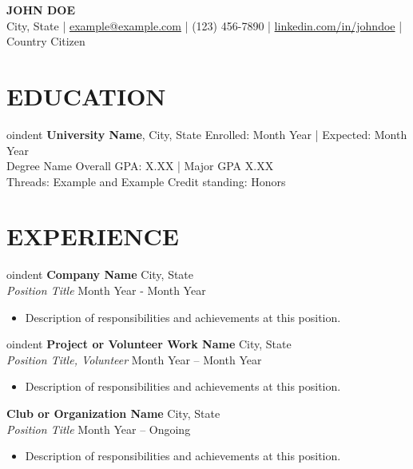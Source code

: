 \documentclass[a4paper,9pt]{extarticle}
\begin{document}
\pagestyle{empty}

\begin{center}
\textbf{\Large JOHN DOE}\\[2pt] %
City, State | \href{mailto:example@example.com}{example@example.com} | (123) 456-7890 | \href{https://www.linkedin.com/in/johndoe}{linkedin.com/in/johndoe} | Country Citizen %
\end{center}

\section*{EDUCATION}

oindent
\textbf{University Name}, City, State \hfill Enrolled: Month Year | Expected: Month Year\\ %
Degree Name \hfill Overall GPA: X.XX | Major GPA X.XX\\ %
Threads: Example and Example \hfill Credit standing: Honors %

\section*{EXPERIENCE}

oindent
\textbf{Company Name} \hfill City, State\\ %
\textit{Position Title} \hfill Month Year - Month Year %
\begin{itemize}
    \item Description of responsibilities and achievements at this position. %
\end{itemize}


oindent
\textbf{Project or Volunteer Work Name} \hfill City, State\\ %
\textit{Position Title, Volunteer} \hfill Month Year – Month Year %
\begin{itemize}
    \item Description of responsibilities and achievements at this position. %
\end{itemize}

\textbf{Club or Organization Name} \hfill City, State\\ %
\textit{Position Title} \hfill Month Year – Ongoing %
\begin{itemize}
    \item Description of responsibilities and achievements at this position. %
\end{itemize}
\end{document}
